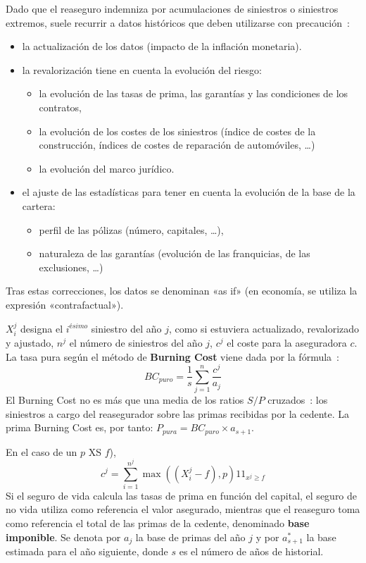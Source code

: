 \begin{f}
	
	Dado que el reaseguro indemniza por acumulaciones de siniestros o siniestros extremos, suele recurrir a datos históricos que deben utilizarse con precaución~:
	\begin{itemize}
		\item la actualización de los datos (impacto de la inflación monetaria).
		\item la revalorización tiene en cuenta la evolución del riesgo:
		\begin{itemize}
			\item la evolución de las tasas de prima, las garantías y las condiciones de los contratos,
			\item la evolución de los costes de los siniestros (índice de costes de la construcción, índices de costes de reparación de automóviles, \ldots)
			\item la evolución del marco jurídico.
		\end{itemize}
		\item el ajuste de las estadísticas para tener en cuenta la evolución de la base de la cartera:
		\begin{itemize}
			\item perfil de las pólizas (número, capitales, \ldots),
			\item naturaleza de las garantías (evolución de las franquicias, de las exclusiones, \ldots)
		\end{itemize}
	\end{itemize}
	Tras estas correcciones, los datos se denominan «as if» (en economía, se utiliza la expresión «contrafactual»).

\end{f}


\begin{f}
	
	\(X_{i}^{j}\) designa el \(i^{ésimo}\) siniestro  del año \(j\), como si estuviera actualizado, revalorizado y  ajustado,
	\(n^j\) el número de siniestros del año \(j\), \(c^{j}\) el coste para la aseguradora \(c\).
	La tasa pura según el método de \textbf{Burning Cost} viene dada por la fórmula~:
	\[
	BC_{puro}=\frac{1}{s}\sum_{j=1}^{n}\frac{c^{j}}{a_{j}}
	\] 
	El Burning Cost no es más que una media de los ratios \(S/P\) cruzados~: los siniestros a cargo del reasegurador sobre las primas recibidas por la cedente.
	La prima Burning Cost es, por tanto: \(P_{pura}=BC_{puro}\times a_{s+1}\).
	
	En el caso de un \(p\) XS \(f\)), \[
	c^{j}=\sum_{i=1}^{n^j}\max\left(  \left( X_{i}^{j}-f\right),p\right) 1\!\!1_{x^{j}\geq f}
	\]
	Si el seguro de vida calcula las tasas de prima en función del capital, el seguro de no vida utiliza como referencia el valor asegurado, mientras que el reaseguro toma como referencia el total de las primas de la cedente, denominado \textbf{base imponible}.
	Se denota por \(a_{j}\) la base de primas del año \(j\) y por \(a_{s+1}^{*}\) la base estimada para el año siguiente, donde \(s\) es el número de años de historial.
\end{f}



